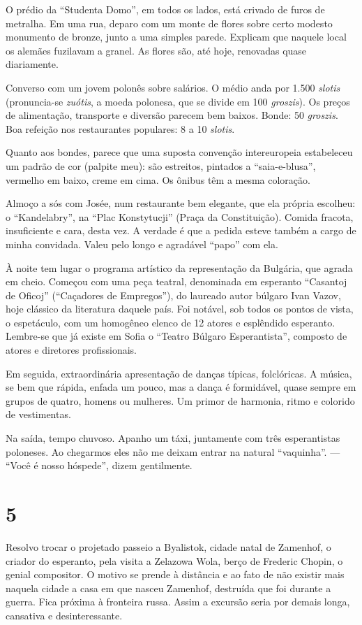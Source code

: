 O prédio da ``Studenta Domo'', em todos os lados, está crivado de furos de metralha. Em uma rua, deparo com um monte de flores sobre certo modesto monumento de bronze, junto a uma simples parede. Explicam que naquele local os alemães fuzilavam a granel. As flores são, até hoje, renovadas quase diariamente.

Converso com um jovem polonês sobre salários. O médio anda por 1.500 \textit{slotis} (pronuncia-se \textit{zuótis}, a moeda polonesa, que se divide em 100 \textit{groszis}). Os preços de alimentação, transporte e diversão parecem bem baixos. Bonde: 50 \textit{groszis}. Boa refeição nos restaurantes populares: 8 a 10 \textit{slotis}.

Quanto aos bondes, parece que uma suposta convenção intereuropeia estabeleceu um padrão de cor (palpite meu): são estreitos, pintados a ``saia-e-blusa'', vermelho em baixo, creme em cima. Os ônibus têm a mesma coloração.

Almoço a sós com Josée, num restaurante bem elegante, que ela própria escolheu: o ``Kandelabry'', na ``Plac Konstytucji'' (Praça da Constituição). Comida fracota, insuficiente e cara, desta vez. A verdade é que a pedida esteve também a cargo de minha convidada. Valeu pelo longo e agradável ``papo'' com ela.

À noite tem lugar o programa artístico da representação da Bulgária, que agrada em cheio. Começou com uma peça teatral, denominada em esperanto ``Casantoj de Oficoj'' (``Caçadores de Empregos''), do laureado autor búlgaro Ivan Vazov, hoje clássico da literatura daquele país. Foi notável, sob todos os pontos de vista, o espetáculo, com um homogêneo elenco de 12 atores e esplêndido esperanto. Lembre-se que já existe em Sofia o ``Teatro Búlgaro Esperantista'', composto de atores e diretores profissionais.

Em seguida, extraordinária apresentação de danças típicas, folclóricas. A música, se bem que rápida, enfada um pouco, mas a dança é formidável, quase sempre em grupos de quatro, homens ou mulheres. Um primor de harmonia, ritmo e colorido de vestimentas.

Na saída, tempo chuvoso. Apanho um táxi, juntamente com três esperantistas poloneses. Ao chegarmos eles não me deixam entrar na natural ``vaquinha''. --- ``Você é nosso hóspede'', dizem gentilmente.

\section*{5 \adfflatleafright {}}
Resolvo trocar o projetado passeio a Byalistok, cidade natal de Zamenhof, o criador do esperanto, pela visita a Zelazowa Wola, berço de Frederic Chopin, o genial compositor. O motivo se prende à distância e ao fato de não existir mais naquela cidade a casa em que nasceu Zamenhof, destruída que foi durante a guerra. Fica próxima à fronteira russa. Assim a excursão seria por demais longa, cansativa e desinteressante.

